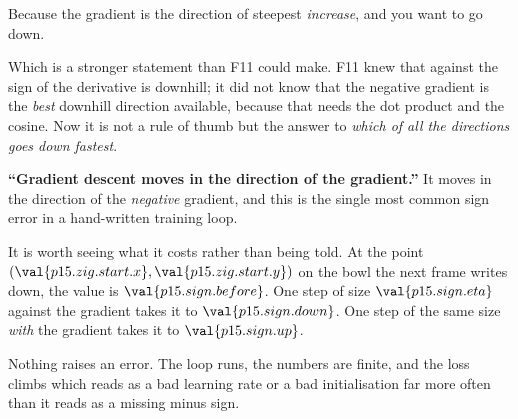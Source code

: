 \begin{fr}
\begin{ansblock}
Because the gradient is the direction of steepest \emph{increase}, and you
want to go down.
\end{ansblock}

Which is a stronger statement than F11 could make. F11 knew that against the
sign of the derivative is downhill; it did not know that the negative gradient
is the \emph{best} downhill direction available, because that needs the dot
product and the cosine. Now it is not a rule of thumb but the answer to
\emph{which of all the directions goes down fastest}.

\begin{trapbox}
\textbf{\enquote{Gradient descent moves in the direction of the gradient.}}
It moves in the direction of the \emph{negative} gradient, and this is the
single most common sign error in a hand-written training loop.

It is worth seeing what it costs rather than being told. At the point
$(\val{p15.zig.start.x}, \val{p15.zig.start.y})$ on the bowl the next frame
writes down, the value is $\val{p15.sign.before}$. One step of size
$\val{p15.sign.eta}$ against the gradient takes it to $\val{p15.sign.down}$.
One step of the same size \emph{with} the gradient takes it to
$\val{p15.sign.up}$.

Nothing raises an error. The loop runs, the numbers are finite, and the loss
climbs \dash{} which reads as a bad learning rate or a bad initialisation far
more often than it reads as a missing minus sign.
\end{trapbox}
\end{fr}

